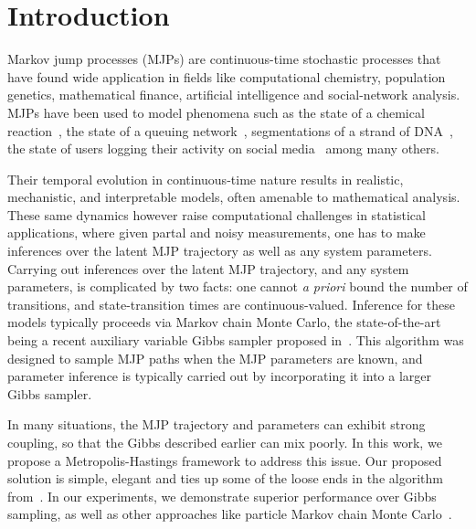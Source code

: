 \section{Introduction}
\label{sec:intro}
Markov jump processes (MJPs) are continuous-time stochastic processes that
have found wide application in fields like computational chemistry, 
population genetics, mathematical finance, artificial intelligence and
social-network analysis. MJPs have been used to model phenomena such 
as the state of a chemical reaction~\cite{gillespie97}, the state of a queuing 
network~\cite{Breuer2003}, segmentations of a strand of 
DNA~\cite{FearnSher2006}, the state of 
users logging their activity on social media~\cite{pan2016markov} among many others.

Their temporal evolution in continuous-time nature results
in realistic, mechanistic, and interpretable models, often amenable to 
mathematical analysis.  These same dynamics however raise computational
challenges in statistical applications, where given partal and noisy 
measurements,
one has to make inferences over  the latent MJP trajectory as well
as any system parameters. Carrying out inferences over the 
latent MJP trajectory, and any system parameters, is complicated by two
facts: one cannot {\em a priori} bound the number of transitions, and 
state-transition times are continuous-valued. Inference for these models 
typically proceeds via Markov chain Monte Carlo, the state-of-the-art 
being a recent auxiliary variable Gibbs sampler proposed 
in~\cite{RaoTeh13}.  This algorithm was designed to sample MJP paths 
when the MJP parameters 
are known, and parameter inference is typically carried out by 
incorporating it into a larger Gibbs sampler. 

In many situations, the MJP trajectory and parameters can exhibit strong 
coupling, so that the Gibbs described earlier can mix poorly.  
In this work, we propose a Metropolis-Hastings framework to address
this issue. Our proposed solution is simple, elegant and ties
up some of the loose ends in the algorithm from~\cite{RaoTeh13}.
In our experiments, we demonstrate superior performance over Gibbs
sampling, as well as other approaches like particle Markov chain Monte 
Carlo~\cite{Andrieu10}.

